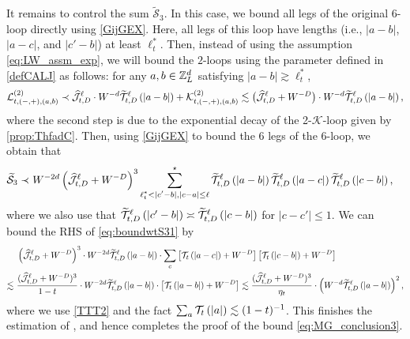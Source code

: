 It remains to control the sum $\widetilde{\mathcal{S}}_3$. In this case, we bound all legs of the original $6$-loop directly using \eqref{GijGEX}. Here, all legs of this loop have lengths (i.e., $|a-b|$, $|a-c|$, and $|c'-b|$) at least $\ell_t^\ast$. Then, instead of using the assumption \eqref{eq:LW_assm_exp}, we will bound the $2$-loops using the parameter defined in \eqref{defCALJ} as follows: for any $a,b\in {\mathbb Z}_L^d$ satisfying $|a-b|\gtrsim \ell_t^\ast$,  
\begin{equation}\label{eq_L2-J}
    \mathcal{L}^{(2)}_{t,(-,+),(a,b)} \prec \widehat{\mathcal{J}}^{\ell}_{t,D} \cdot W^{-d} \widetilde{\mathcal{T}}^{\ell}_{t,D}\left({|a-b|}\right) + \mathcal{K}^{(2)}_{t,(-,+),(a,b)} \lesssim \big(\widehat{\mathcal{J}}^{\ell}_{t,D} +W^{-D}\big)\cdot W^{-d} \widetilde{\mathcal{T}}^{\ell}_{t,D}\left({|a-b|}\right) ,
\end{equation}
where the second step is due to the exponential decay of the 2-$\mathcal{K}$-loop given by \eqref{prop:ThfadC}. 
Then, using \eqref{GijGEX} to bound the 6 legs of the 6-loop, we obtain that 
\begin{align}
    \widetilde{\mathcal{S}}_3 \prec &~W^{-2d}\left({\widehat{\mathcal{J}}^{\ell}_{t,D}+W^{-D}}\right)^3\sum_{\substack{\ell_t^\ast < |c'-b|,|c-a| \le \ell}}^\star \widetilde{\mathcal{T}}^{\ell}_{t,D}\left({|a-b|}\right) \widetilde{\mathcal{T}}^{\ell}_{t,D}\left({|a-c|}\right)  \widetilde{\mathcal{T}}^{\ell}_{t,D}\left({|c-b|}\right) ,\label{eq:boundwtS31}
\end{align}
where we also use that 
$\widetilde{\mathcal{T}}_{t,D}^{\ell}\left({|c'-b|}\right)\asymp \widetilde{\mathcal{T}}_{t,D}^{\ell}\left({|c-b|}\right)$ for $|c-c'|\le 1$. We can bound the RHS of \eqref{eq:boundwtS31} by
\begin{align*}
&~\left(\widehat{\mathcal{J}}^{\ell}_{t,D}+W^{-D}\right)^3\cdot W^{-2d} \widetilde{\mathcal{T}}^{\ell}_{t,D}\left({|a-b|}\right)\cdot \sum_c \left[{\mathcal{T}_{t}\left({|a-c|}\right)+W^{-D}}\right]\left[{\mathcal{T}_{t}\left({|c-b|}\right)+W^{-D}}\right] \\
\lesssim &~\frac{(\widehat{\mathcal{J}}^{\ell}_{t,D}+W^{-D})^3}{1-t} \cdot W^{-2d} \widetilde{\mathcal{T}}^{\ell}_{t,D}\left({|a-b|}\right)\cdot \left[{\mathcal{T}_{t}\left({|a-b|}\right) +W^{-D}}\right]\lesssim \frac{(\widehat{\mathcal{J}}^{\ell}_{t,D}+W^{-D})^3}{\eta_t} \cdot \left(W^{-d} \widetilde{\mathcal{T}}^{\ell}_{t,D}\left({|a-b|}\right)\right)^2,
\end{align*}
where we use \eqref{TTT2} and the fact $\sum_{a}\mathcal T_t\left({|a|}\right)\lesssim (1-t)^{-1}$. This finishes the estimation of , and hence completes the proof of the bound \eqref{eq:MG_conclusion3}.

